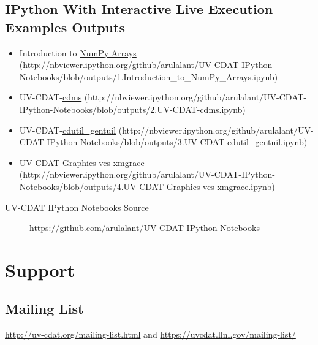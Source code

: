 \documentclass[letterpaper,10pt,english]{sphinxmanual}
\begin{document}
\subsection{IPython With Interactive Live Execution Examples Outputs}
\label{getting_started:ipython-with-interactive-live-execution-examples-outputs}\begin{itemize}
\item {} 
Introduction to \href{http://nbviewer.ipython.org/github/arulalant/UV-CDAT-IPython-Notebooks/blob/outputs/1.Introduction\_to\_NumPy\_Arrays.ipynb}{NumPy Arrays} (http://nbviewer.ipython.org/github/arulalant/UV-CDAT-IPython-Notebooks/blob/outputs/1.Introduction\_to\_NumPy\_Arrays.ipynb)

\item {} 
UV-CDAT-\href{http://nbviewer.ipython.org/github/arulalant/UV-CDAT-IPython-Notebooks/blob/outputs/2.UV-CDAT-cdms.ipynb}{cdms} (http://nbviewer.ipython.org/github/arulalant/UV-CDAT-IPython-Notebooks/blob/outputs/2.UV-CDAT-cdms.ipynb)

\item {} 
UV-CDAT-\href{http://nbviewer.ipython.org/github/arulalant/UV-CDAT-IPython-Notebooks/blob/outputs/3.UV-CDAT-cdutil\_gentuil.ipynb}{cdutil\_gentuil} (http://nbviewer.ipython.org/github/arulalant/UV-CDAT-IPython-Notebooks/blob/outputs/3.UV-CDAT-cdutil\_gentuil.ipynb)

\item {} 
UV-CDAT-\href{http://nbviewer.ipython.org/github/arulalant/UV-CDAT-IPython-Notebooks/blob/outputs/4.UV-CDAT-Graphics-vcs-xmgrace.ipynb}{Graphics-vcs-xmgrace} (http://nbviewer.ipython.org/github/arulalant/UV-CDAT-IPython-Notebooks/blob/outputs/4.UV-CDAT-Graphics-vcs-xmgrace.ipynb)

\end{itemize}
\begin{description}
\item[{UV-CDAT IPython Notebooks Source}] \leavevmode
\href{https://github.com/arulalant/UV-CDAT-IPython-Notebooks}{https://github.com/arulalant/UV-CDAT-IPython-Notebooks}

\end{description}


\section{Support}
\label{getting_started:support}

\subsection{Mailing List}
\label{getting_started:mailing-list}
\href{http://uv-cdat.org/mailing-list.html}{http://uv-cdat.org/mailing-list.html}  and  \href{https://uvcdat.llnl.gov/mailing-list/}{https://uvcdat.llnl.gov/mailing-list/}
\end{document}
